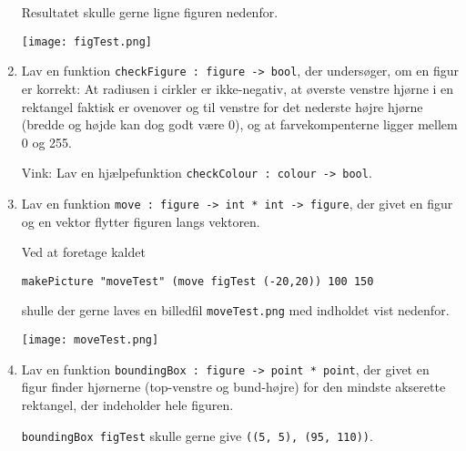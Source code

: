 \documentclass[a4paper,12pt]{article}
\begin{document}
\begin{enumerate}[label=8ø.\arabic*]
  Resultatet skulle gerne ligne figuren nedenfor.
  \begin{center}
    \texttt{[image: figTest.png]}
  \end{center}
\item Lav en funktion \texttt{checkFigure : figure -> bool},
  der undersøger, om en figur er korrekt: At radiusen i cirkler
  er ikke-negativ, at øverste venstre hjørne i en rektangel faktisk
  er ovenover og til venstre for det nederste højre hjørne (bredde og
  højde kan dog godt være 0), og at farvekompenterne ligger mellem 0
  og 255.

  Vink: Lav en hjælpefunktion \texttt{checkColour : colour -> bool}.

\item Lav en funktion \texttt{move : figure -> int * int ->
    figure}, der givet en figur og en vektor flytter figuren langs
  vektoren.
  
  Ved at foretage kaldet
\begin{verbatim}
makePicture "moveTest" (move figTest (-20,20)) 100 150
\end{verbatim}
  shulle der gerne laves en billedfil \texttt{moveTest.png}
  med indholdet vist nedenfor.
  \begin{center}
    \begin{minipage}{.2\textwidth}
      \texttt{[image: moveTest.png]}
    \end{minipage}
  \end{center}
\item Lav en funktion \texttt{boundingBox : figure -> point *
    point}, der givet en figur finder hjørnerne (top-venstre og
  bund-højre) for den mindste akserette rektangel, der indeholder hele
  figuren.
  
  \texttt{boundingBox figTest} skulle gerne give \texttt{((5, 5), (95,
    110))}.
\end{enumerate}
\end{document}
